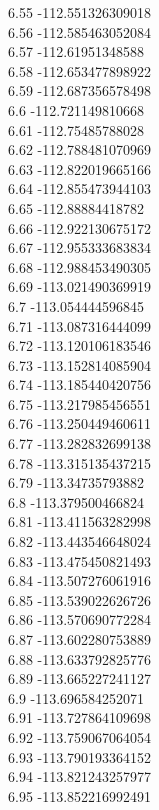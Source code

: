 {6.55	-112.551326309018\\
6.56	-112.585463052084\\
6.57	-112.61951348588\\
6.58	-112.653477898922\\
6.59	-112.687356578498\\
6.6	-112.721149810668\\
6.61	-112.75485788028\\
6.62	-112.788481070969\\
6.63	-112.822019665166\\
6.64	-112.855473944103\\
6.65	-112.88884418782\\
6.66	-112.922130675172\\
6.67	-112.955333683834\\
6.68	-112.988453490305\\
6.69	-113.021490369919\\
6.7	-113.054444596845\\
6.71	-113.087316444099\\
6.72	-113.120106183546\\
6.73	-113.152814085904\\
6.74	-113.185440420756\\
6.75	-113.217985456551\\
6.76	-113.250449460611\\
6.77	-113.282832699138\\
6.78	-113.315135437215\\
6.79	-113.34735793882\\
6.8	-113.379500466824\\
6.81	-113.411563282998\\
6.82	-113.443546648024\\
6.83	-113.475450821493\\
6.84	-113.507276061916\\
6.85	-113.539022626726\\
6.86	-113.570690772284\\
6.87	-113.602280753889\\
6.88	-113.633792825776\\
6.89	-113.665227241127\\
6.9	-113.696584252071\\
6.91	-113.727864109698\\
6.92	-113.759067064054\\
6.93	-113.790193364152\\
6.94	-113.821243257977\\
6.95	-113.852216992491\\
}
